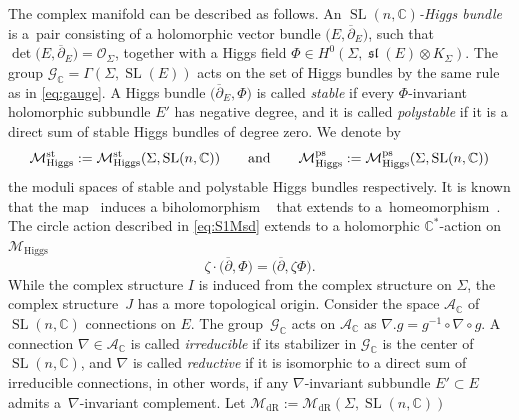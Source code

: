 \documentclass[pdftex]{sigma}
\numberwithin{equation}{section}
\theoremstyle{definition}
\newcommand{\lie}[1]{\operatorname{\mathfrak{#1}}}
\newcommand{\sln}{\lie{sl}}
\newcommand\C{{\mathbb C}}
\begin{document}
The complex manifold  can be described as follows. An \emph{$\operatorname{SL}(n,\C)$-Higgs
bundle} is a~pair consisting of a holomorphic vector bundle $\bigl(E, \overline{\partial}_E\bigr)$, such
that $\det\bigl(E, \overline{\partial}_E\bigr) = \mathcal O_\Sigma$, together with a Higgs field
$\Phi \in H^0(\Sigma, \sln(E)\otimes K_\Sigma)$. The group $\mathcal G_{\C} =
\Gamma(\Sigma, \operatorname{SL}(E))$ acts on the set of Higgs bundles by the same rule as
in \eqref{eq:gauge}. A Higgs bundle $\bigl(\overline{\partial}_E, \Phi\bigr)$ is called \emph{stable}
if every $\Phi$-invariant holomorphic subbundle $E'$ has negative degree, and it
is called \emph{polystable} if it is a direct sum of stable Higgs bundles
of degree zero. We denote by
\[\mathcal{M}_{\mathrm{Higgs}}^{\rm st} := \mathcal{M}_{\mathrm{Higgs}}^{\rm st}(\Sigma,\operatorname{SL}(n,\C))\qquad \text{and}\qquad \mathcal{M}_{\mathrm{Higgs}}^{\rm ps} :=
\mathcal{M}_{\mathrm{Higgs}}^{\rm ps}(\Sigma,\operatorname{SL}(n,\C))\]
the moduli spaces of stable and polystable Higgs bundles
respectively. It is known that the map~ induces a biholomorphism
~
that extends to a~homeomorphism~.
The circle action described in \eqref{eq:S1Msd} extends to a holomorphic $\C^*$-action on $\mathcal{M}_{\mathrm{Higgs}}$
\begin{equation}\label{eq:C*Mh}
\zeta\cdot\bigl(\overline{\partial}, \Phi\bigr) = \bigl(\overline{\partial}, \zeta\Phi\bigr).
\end{equation}
While the complex structure $I$ is induced from the complex structure on $\Sigma$, the
complex structure~$J$ has a more topological origin. Consider the space $\mathcal A_\C$ of $\operatorname{SL}(n,\C)$ connections on $E$. The group~$\mathcal G_\C$ acts on $\mathcal A_\C$ as
$%
\nabla.g = g^{-1}\circ\nabla\circ g$.
A connection $\nabla \in \mathcal A_\C$ is called \emph{irreducible} if its stabilizer in
$\mathcal G_\C$ is the center of $\operatorname{SL}(n,\C)$, and $\nabla$ is called \emph{reductive} if it is
isomorphic to
a direct sum of irreducible connections, in other words, if any $\nabla$-invariant subbundle $E' \subset E$
admits a~$\nabla$-invariant complement. Let
$\mathcal{M}_{\mathrm{dR}} := \mathcal{M}_{\mathrm{dR}}(\Sigma, \operatorname{SL}(n,\C))$
\end{document}

